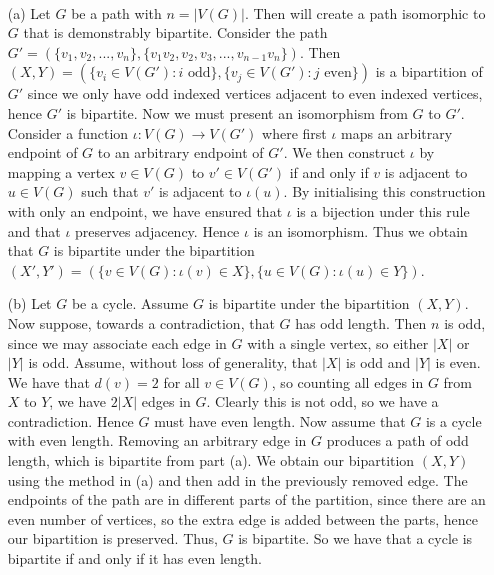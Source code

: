\begin{ans} \
\begin{itemize}
	\item[(a)] Let $G$ be a path with $n = |V(G)|$. Then will create a path isomorphic to $G$ that is demonstrably bipartite. Consider the path $G' = (\{v_1,v_2,...,v_n\},\{v_1v_2,v_2,v_3,...,v_{n-1}v_n\})$. Then $(X,Y) = (\{v_i \in V(G'): \textrm{$i$ odd}\}, \{v_j \in V(G'): \textrm{$j$ even}\})$ is a bipartition of $G'$ since we only have odd indexed vertices adjacent to even indexed vertices, hence $G'$ is bipartite. Now we must present an isomorphism from $G$ to $G'$. Consider a function $\iota: V(G) \to V(G')$ where first $\iota$ maps an arbitrary endpoint of $G$ to an arbitrary endpoint of $G'$. We then construct $\iota$ by mapping a vertex $v \in V(G)$ to $v' \in V(G')$ if and only if $v$ is adjacent to $u \in V(G)$ such that $v'$ is adjacent to $\iota(u)$. By initialising this construction with only an endpoint, we have ensured that $\iota$ is a bijection under this rule and that $\iota$ preserves adjacency. Hence $\iota$ is an isomorphism. Thus we obtain that $G$ is bipartite under the bipartition $(X',Y') = (\{v \in V(G): \iota(v) \in X\},\{u \in V(G): \iota(u) \in Y\})$.
	\item[(b)] Let $G$ be a cycle. Assume $G$ is bipartite under the bipartition $(X,Y)$. Now suppose, towards a contradiction, that $G$ has odd length. Then $n$ is odd, since we may associate each edge in $G$ with a single vertex, so either $|X|$ or $|Y|$ is odd. Assume, without loss of generality, that $|X|$ is odd and $|Y|$ is even. We have that $d(v) = 2$ for all $v \in V(G)$, so counting all edges in $G$ from $X$ to $Y$, we have $2|X|$ edges in $G$. Clearly this is not odd, so we have a contradiction. Hence $G$ must have even length. Now assume that $G$ is a cycle with even length. Removing an arbitrary edge in $G$ produces a path of odd length, which is bipartite from part (a). We obtain our bipartition $(X,Y)$ using the method in (a) and then add in the previously removed edge. The endpoints of the path are in different parts of the partition, since there are an even number of vertices, so the extra edge is added between the parts, hence our bipartition is preserved. Thus, $G$ is bipartite. So we have that a cycle is bipartite if and only if it has even length.
\end{itemize}
\end{ans}